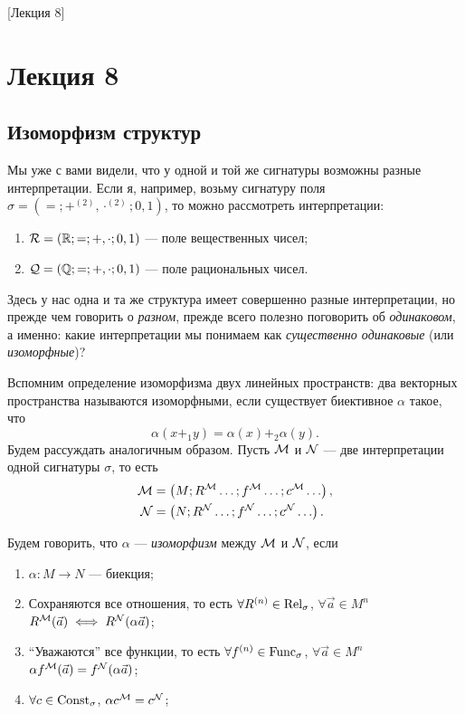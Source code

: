 [Лекция 8]

\section{Лекция 8}

\subsection{Изоморфизм структур}

Мы уже с вами видели, что у одной и той же сигнатуры возможны разные интерпретации.
Если я, например, возьму сигнатуру поля $\sigma = \left( =; +^{(2)}, \cdot^{(2)}; 0, 1 \right)$, то можно рассмотреть интерпретации:
\begin{enumerate}
    \item $\mathcal{R} = \left( \mathbb{R}; =; +, \cdot; 0, 1 \right)$ --- поле вещественных чисел;
    \item $\mathcal{Q} = \left( \mathbb{Q}; =; +, \cdot; 0, 1 \right)$ --- поле рациональных чисел.
\end{enumerate}
Здесь у нас одна и та же структура имеет совершенно разные интерпретации, но прежде чем говорить о {\it разном}, прежде всего полезно поговорить об {\it одинаковом}, а именно: какие интерпретации мы понимаем как {\it существенно одинаковые} (или {\it изоморфные})?

Вспомним определение изоморфизма двух линейных пространств: два векторных пространства называются изоморфными, если существует биективное $\alpha$ такое, что
$$
    \alpha(x +_{1} y) = \alpha(x) +_{2} \alpha(y).
$$
Будем рассуждать аналогичным образом.
Пусть $\mathcal{M}$ и $\mathcal{N}$ --- две интерпретации одной сигнатуры $\sigma$, то есть
\begin{align}
    \mathcal{M} &= \left( M; R^{\mathcal{M}} \ldots; f^{\mathcal{M}} \ldots; c^{\mathcal{M}} \ldots \right), \\
    \mathcal{N} &= \left( N; R^{\mathcal{N}} \ldots; f^{\mathcal{N}} \ldots; c^{\mathcal{N}} \ldots \right).
\end{align}

\begin{definition} \label{def::isomorphism-on-structures}
    Будем говорить, что $\alpha$ --- {\it изоморфизм} между $\mathcal{M}$ и $\mathcal{N}$, если
    \begin{enumerate}
        \item $\alpha \colon M \to N$ --- биекция;
        \item Сохраняются все отношения, то есть $\forall R^{(n)} \in \mathrm{Rel}_{\sigma}$, $\forall \vec{a} \in M^{n}$ $R^{\mathcal{M}}(\vec{a}) \iff R^{\mathcal{N}}(\alpha \vec{a})$;
        \item \enquote{Уважаются} все функции, то есть $\forall f^{(n)} \in \mathrm{Func}_{\sigma}$, $\forall \vec{a} \in M^{n}$ $\alpha f^{\mathcal{M}}(\vec{a}) = f^{\mathcal{N}}(\alpha \vec{a})$;
        \item $\forall c \in \mathrm{Const}_{\sigma}$, $\alpha c^{\mathcal{M}} = c^{\mathcal{N}}$;
    \end{enumerate}
\end{definition}

